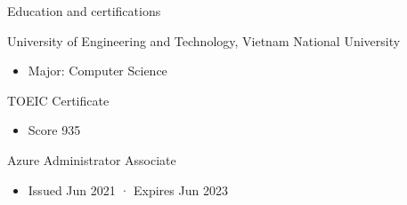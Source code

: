 \documentclass{article}
\newlength{\tabin}
\newlength{\secsep}
\newcommand{\lineunder}{\vspace*{-8pt} \\ \hspace*{-6pt} \hrulefill \\ \vspace*{-15pt}}
\newenvironment{tabbedsection}[1]{
  \begin{list}{}{
      \setlength{\itemsep}{0pt}
      \setlength{\labelsep}{0pt}
      \setlength{\labelwidth}{0pt}
      \setlength{\leftmargin}{\tabin}
      \setlength{\rightmargin}{\tabin}
      \setlength{\listparindent}{0pt}
      \setlength{\parsep}{0pt}
      \setlength{\parskip}{0pt}
      \setlength{\partopsep}{0pt}
      \setlength{\topsep}{#1}
    }
  \item[]
}{\end{list}}
\newenvironment{resume_section}[1]{
  \filbreak
  \vspace{2\secsep}
  \textsc{\large#1}
  \lineunder
  \begin{tabbedsection}{\secsep}
}{\end{tabbedsection}}
\newenvironment{resume_subsection}[2][]{
  \textbf{#2} \hfill {\footnotesize #1} \hspace{2em}
  \begin{tabbedsection}{0.5\secsep}
}{\end{tabbedsection}}
\newenvironment{subitems}{
  \renewcommand{\labelitemi}{-}
  \begin{itemize}
      \setlength{\labelsep}{1em}
}{\end{itemize}}
\begin{document}
  \begin{resume_section}{Education and certifications}

    \begin{resume_subsection}[Hanoi (2015-2021)]{University of Engineering and Technology, Vietnam National University}
      \begin{subitems}
        \item Major: Computer Science
      \end{subitems}
    \end{resume_subsection}

    \begin{resume_subsection}[Nov 2020]{TOEIC Certificate}
      \begin{subitems}
        \item Score 935
      \end{subitems}
    \end{resume_subsection}

    \begin{resume_subsection}[Jun 2021]{Azure Administrator Associate}
      \begin{subitems}
        \item Issued Jun 2021 · Expires Jun 2023
      \end{subitems}
    \end{resume_subsection}

  \end{resume_section}
\end{document}

